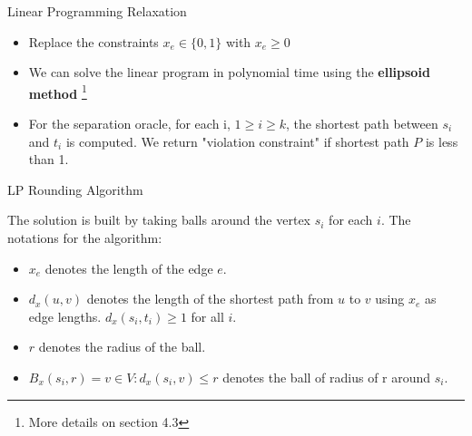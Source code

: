 \documentclass{beamer}
\begin{document}
\begin{frame}{Linear Programming Relaxation}
    \begin{itemize}
        \item Replace the constraints $ x_e \in \{0, 1\} $ with $ x_e \geq 0 $ \newline

        \item We can solve the linear program in polynomial time using the \textbf{ellipsoid method} \footnote{More details on section 4.3}  \newline

        \item For the separation oracle, for each i, $ 1 \geq i \geq k $, the shortest path between $ s_i$ and $t_i$ is computed. We return "violation constraint" if shortest path $ P $ is less than 1. 

    \end{itemize}
    
\end{frame}


\begin{frame}{LP Rounding Algorithm}

The solution is built by taking balls around the vertex $s_i$ for each $i$. The notations for the algorithm: 

\begin{itemize}
  \item $ x_e $ denotes the length of the edge $e$. 
  \item $d_x(u,v)$ denotes the length of the shortest path from $u$ to $v$ using $x_e$ as edge lengths. $ d_x(s_i, t_i) \geq 1 $ for all $i$. 
  \pause
  \item $r$ denotes the radius of the ball. 
  \item $ B_x(s_i, r) = { v \in V : d_x(s_i, v) \leq r} $ denotes the ball of radius of r around $s_i$. 
\end{itemize}
\end{frame}
\end{document}
